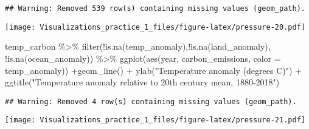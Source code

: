 \documentclass[
]{article}
\newenvironment{Shaded}{\begin{snugshade}}{\end{snugshade}}
\newcommand{\AttributeTok}[1]{\textcolor[rgb]{0.77,0.63,0.00}{#1}}
\newcommand{\FunctionTok}[1]{\textcolor[rgb]{0.00,0.00,0.00}{#1}}
\newcommand{\NormalTok}[1]{#1}
\newcommand{\SpecialCharTok}[1]{\textcolor[rgb]{0.00,0.00,0.00}{#1}}
\newcommand{\StringTok}[1]{\textcolor[rgb]{0.31,0.60,0.02}{#1}}
\begin{document}
\begin{verbatim}
## Warning: Removed 539 row(s) containing missing values (geom_path).
\end{verbatim}

\texttt{[image: Visualizations\_practice\_1\_files/figure-latex/pressure-20.pdf]}

\begin{Shaded}
\begin{Highlighting}[]
\NormalTok{temp\_carbon }\SpecialCharTok{\%\textgreater{}\%} \FunctionTok{filter}\NormalTok{(}\SpecialCharTok{!}\FunctionTok{is.na}\NormalTok{(temp\_anomaly),}\SpecialCharTok{!}\FunctionTok{is.na}\NormalTok{(land\_anomaly),}
                      \SpecialCharTok{!}\FunctionTok{is.na}\NormalTok{(ocean\_anomaly)) }\SpecialCharTok{\%\textgreater{}\%}
  \FunctionTok{ggplot}\NormalTok{(}\FunctionTok{aes}\NormalTok{(year, carbon\_emissions, }\AttributeTok{color =}\NormalTok{ temp\_anomaly)) }\SpecialCharTok{+}\FunctionTok{geom\_line}\NormalTok{() }\SpecialCharTok{+} 
  \FunctionTok{ylab}\NormalTok{(}\StringTok{"Temperature anomaly (degrees C)"}\NormalTok{) }\SpecialCharTok{+}
  \FunctionTok{ggtitle}\NormalTok{(}\StringTok{"Temperature anomaly relative to 20th century mean, 1880{-}2018"}\NormalTok{)}
\end{Highlighting}
\end{Shaded}

\begin{verbatim}
## Warning: Removed 4 row(s) containing missing values (geom_path).
\end{verbatim}

\texttt{[image: Visualizations\_practice\_1\_files/figure-latex/pressure-21.pdf]}
\end{document}
